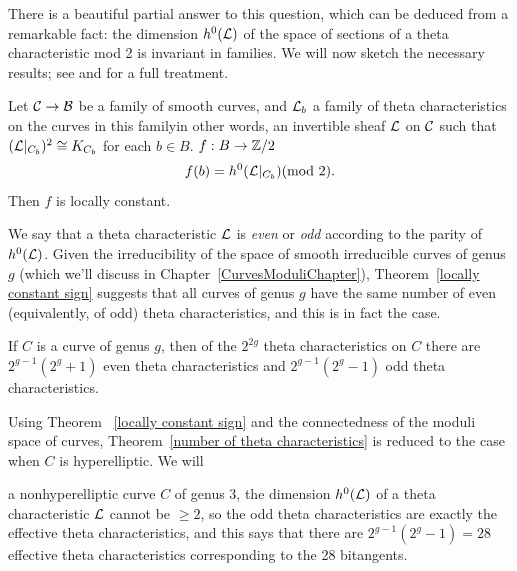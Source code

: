  There is a beautiful partial answer to this question, which can be
 deduced from a remarkable fact: the dimension $h^0({\mathcal L})$ of the space
 of sections of a theta characteristic mod 2 is invariant in families.
We will now
sketch the necessary results; see \cite{MumfordPaper} and \cite{JHPaper}
for a full treatment.

 \begin{theorem}
 \label{locally constant sign}
 Let $\cal C \to B$ be a family of smooth curves, and ${\mathcal L}_b$ a family of
 theta characteristics on the curves in this family\emdash in other words, an
 invertible sheaf ${\mathcal L}$ on $\cal C$ such that $({\mathcal L}|_{C_b})^2 \cong K_{C_b}$
 for each $b \in B$.
$f : B \to {\mathbb Z}/2$
 $$
 f(b) = h^0({\mathcal L}|_{C_b}) \relax  \relax (\mathrm{mod\ } 2).
 $$
Then $f$ is locally constant.
\unif
\end{theorem}

We say that a theta characteristic ${\mathcal L}$ is \emph{even} or \emph{odd}
%
according to the parity of $h^0({\mathcal L})$. Given the irreducibility of the
space of smooth irreducible curves of genus $g$ (which we'll discuss
in Chapter~\ref{CurvesModuliChapter}),
Theorem~\ref{locally constant sign}
suggests that all curves of genus $g$ have the same number of
even (equivalently, of odd) theta characteristics, and this is in fact
the case.

\begin{theorem}
\label{number of theta characteristics}
If $C$ is a curve of genus $g$, then of the $2^{2g}$ theta characteristics
on $C$ there are $2^{g-1}(2^g + 1)$ even theta characteristics and
$2^{g-1}(2^g-1)$ odd theta characteristics.
\unif
\end{theorem}

Using Theorem ~\ref{locally constant sign} and the connectedness of the
moduli space of curves,
Theorem~\ref{number of theta characteristics} is reduced to the case when
$C$ is hyperelliptic. We will

a nonhyperelliptic curve $C$ of genus 3, the
dimension $h^0({\mathcal L})$ of a theta characteristic ${\mathcal L}$ cannot be $\geq 2$, so
the odd theta characteristics are exactly the effective theta
characteristics, and  this says
that there are $2^{g-1}(2^g-1)
= 28$ effective theta characteristics corresponding to the 28 bitangents.
%

